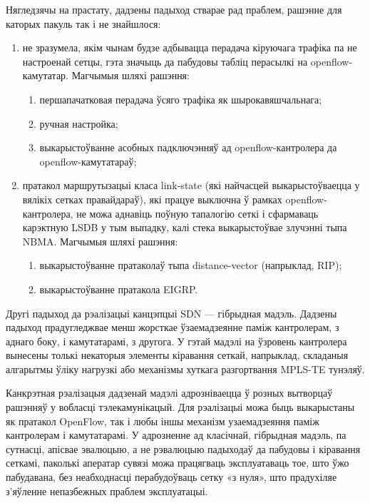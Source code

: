 Нягледзячы на прастату, дадзены падыход стварае рад праблем, рашэнне для каторых
пакуль так і не знайшлося:
\begin{enumerate}
    \item не зразумела, якім чынам будзе адбывацца перадача кіруючага трафіка па
    не настроенай сетцы, гэта значыць да пабудовы табліц перасылкі на openflow-камутатар. Магчымыя шляхі рашэння:
    \begin{enumerate}
        \item першапачатковая перадача ўсяго трафіка як шырокавяшчальнага;
        \item ручная настройка;
        \item выкарыстоўванне асобных падключэнняў ад openflow-кантролера да openflow-камутатараў;
    \end{enumerate}
    \item пратакол маршрутызацыі класа link-state (які найчасцей выкарыстоўваецца у вялікіх сетках правайдараў), які працуе выключна ў рамках openflow-кантролера, не можа
    аднавіць поўную тапалогію сеткі і сфармаваць карэктную LSDB у тым выпадку,
    калі стека выкарыстоўвае злучэнні тыпа NBMA. Магчымыя шляхі рашэння:
        \begin{enumerate}
            \item выкарыстоўванне пратаколаў тыпа distance-vector (напрыклад, RIP);
            \item выкарыстоўванне пратакола EIGRP.
        \end{enumerate}
\end{enumerate}

Другі падыход да рэалізацыі канцэпцыі SDN ---
гібрыдная мадэль.
Дадзены падыход прадугледжвае менш жорсткае ўзаемадзеянне паміж
кантролерам, з аднаго боку, і камутатарамі, з другога.
У гэтай мадэлі на ўзровень кантролера вынесены толькі некаторыя элементы кіравання сеткай, напрыклад, складаныя
алгарытмы ўліку нагрузкі або механізмы хуткага разгортвання MPLS-TE тунэляў.

Канкрэтная рэалізацыя дадзенай мадэлі адрозніваецца ў розных вытворцаў рашэнняў у вобласці тэлекамунікацый. Для рэалізацыі можа быць выкарыстаны як пратакол OpenFlow,
так і любы іншы механізм узаемадзеяння паміж кантролерам і камутатарамі.
У адрозненне ад класічнай, гібрыдная мадэль, па сутнасці, апісвае эвалюцыю, а не рэвалюцыю падыходаў да пабудовы і кіравання сеткамі, паколькі аператар сувязі можа
працягваць эксплуатаваць тое, што ўжо пабудавана, без неабходнасці перабудоўваць
сетку «з нуля», што прадухіляе з'яўленне непазбежных праблем эксплуатацыі.

